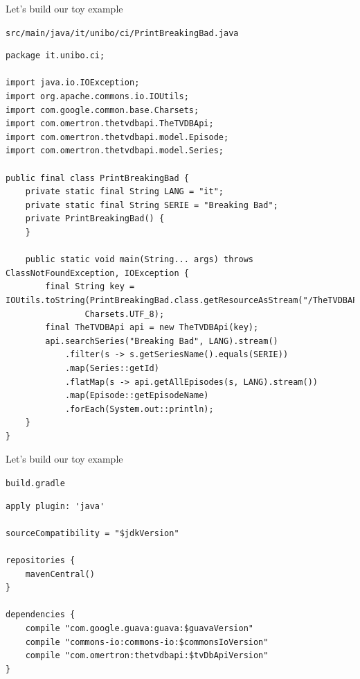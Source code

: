 \documentclass[presentation]{beamer}
\begin{document}
\begin{frame}[fragile]{Let's build our toy example}
	\begin{block}{\texttt{src/main/java/it/unibo/ci/PrintBreakingBad.java}}
		\begin{verbatim}
package it.unibo.ci;

import java.io.IOException;
import org.apache.commons.io.IOUtils;
import com.google.common.base.Charsets;
import com.omertron.thetvdbapi.TheTVDBApi;
import com.omertron.thetvdbapi.model.Episode;
import com.omertron.thetvdbapi.model.Series;

public final class PrintBreakingBad {
    private static final String LANG = "it";
    private static final String SERIE = "Breaking Bad";
    private PrintBreakingBad() {
    }

    public static void main(String... args) throws ClassNotFoundException, IOException {
        final String key = IOUtils.toString(PrintBreakingBad.class.getResourceAsStream("/TheTVDBAPIKey"),
                Charsets.UTF_8);
        final TheTVDBApi api = new TheTVDBApi(key);
        api.searchSeries("Breaking Bad", LANG).stream()
            .filter(s -> s.getSeriesName().equals(SERIE))
            .map(Series::getId)
            .flatMap(s -> api.getAllEpisodes(s, LANG).stream())
            .map(Episode::getEpisodeName)
            .forEach(System.out::println);
    }
}
		\end{verbatim}
	\end{block}
\end{frame}

\begin{frame}[fragile]{Let's build our toy example}
	\begin{block}{\texttt{build.gradle}}
		\begin{verbatim}
apply plugin: 'java'

sourceCompatibility = "$jdkVersion"

repositories {
    mavenCentral()
}

dependencies {
    compile "com.google.guava:guava:$guavaVersion"
    compile "commons-io:commons-io:$commonsIoVersion"
    compile "com.omertron:thetvdbapi:$tvDbApiVersion"
}
		\end{verbatim}
	\end{block}
\end{frame}
\end{document}
